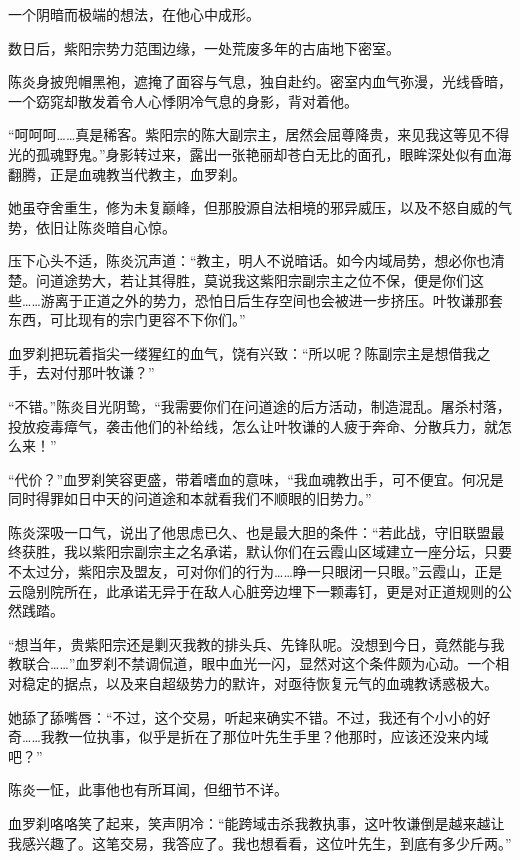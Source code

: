 一个阴暗而极端的想法，在他心中成形。

\vspace{2em}

数日后，紫阳宗势力范围边缘，一处荒废多年的古庙地下密室。

陈炎身披兜帽黑袍，遮掩了面容与气息，独自赴约。密室内血气弥漫，光线昏暗，一个窈窕却散发着令人心悸阴冷气息的身影，背对着他。

“呵呵呵……真是稀客。紫阳宗的陈大副宗主，居然会屈尊降贵，来见我这等见不得光的孤魂野鬼。”身影转过来，露出一张艳丽却苍白无比的面孔，眼眸深处似有血海翻腾，正是血魂教当代教主，血罗刹。

她虽夺舍重生，修为未复巅峰，但那股源自法相境的邪异威压，以及不怒自威的气势，依旧让陈炎暗自心惊。

压下心头不适，陈炎沉声道：“教主，明人不说暗话。如今内域局势，想必你也清楚。问道途势大，若让其得胜，莫说我这紫阳宗副宗主之位不保，便是你们这些……游离于正道之外的势力，恐怕日后生存空间也会被进一步挤压。叶牧谦那套东西，可比现有的宗门更容不下你们。”

血罗刹把玩着指尖一缕猩红的血气，饶有兴致：“所以呢？陈副宗主是想借我之手，去对付那叶牧谦？”

“不错。”陈炎目光阴鸷，“我需要你们在问道途的后方活动，制造混乱。屠杀村落，投放疫毒瘴气，袭击他们的补给线，怎么让叶牧谦的人疲于奔命、分散兵力，就怎么来！”

“代价？”血罗刹笑容更盛，带着嗜血的意味，“我血魂教出手，可不便宜。何况是同时得罪如日中天的问道途和本就看我们不顺眼的旧势力。”

陈炎深吸一口气，说出了他思虑已久、也是最大胆的条件：“若此战，守旧联盟最终获胜，我以紫阳宗副宗主之名承诺，默认你们在云霞山区域建立一座分坛，只要不太过分，紫阳宗及盟友，可对你们的行为……睁一只眼闭一只眼。”云霞山，正是云隐别院所在，此承诺无异于在敌人心脏旁边埋下一颗毒钉，更是对正道规则的公然践踏。

“想当年，贵紫阳宗还是剿灭我教的排头兵、先锋队呢。没想到今日，竟然能与我教联合……”血罗刹不禁调侃道，眼中血光一闪，显然对这个条件颇为心动。一个相对稳定的据点，以及来自超级势力的默许，对亟待恢复元气的血魂教诱惑极大。

她舔了舔嘴唇：“不过，这个交易，听起来确实不错。不过，我还有个小小的好奇……我教一位执事，似乎是折在了那位叶先生手里？他那时，应该还没来内域吧？”

陈炎一怔，此事他也有所耳闻，但细节不详。

血罗刹咯咯笑了起来，笑声阴冷：“能跨域击杀我教执事，这叶牧谦倒是越来越让我感兴趣了。这笔交易，我答应了。我也想看看，这位叶先生，到底有多少斤两。”

